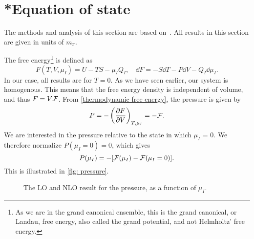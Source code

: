 \section{*Equation of state}
\label{section: equation of state}


The methods and analysis of this section are based on~\autocite{adhikariTwoflavorChiralPerturbation2019,andersenIntroductionStatisticalMechanics2012,peskinIntroductionQuantumField1995}.
All results in this section are given in units of $m_\pi$.

The free energy\footnote{
    As we are in the grand canonical ensemble, this is the grand canonical, or Landau, free energy, also called the grand potential, and not Helmholtz' free energy.
    }
is defined as
%
\begin{equation}
    \label{thermodynamic free energy}
    F(T, V, \mu_I) = U - TS - \mu_I Q_I, 
    \quad \dd 
    F = - S \dd T - P \dd V - Q_I \dd \mu_I.
\end{equation}
%
In our case, all results are for $T = 0$.
As we have seen earlier, our system is homogenous.
This means that the free energy density is independent of volume, and thus $F = V \mathcal{F}$.
From \autoref{thermodynamic free energy}, the pressure is given by
%
\begin{equation}
    P = - \left(\pdv{F}{V}\right)_{T, \mu_I} = - \mathcal{F}.
\end{equation}
%
We are interested in the pressure relative to the state in which $\mu_I$ = 0. We therefore normalize $P(\mu_I=0) = 0$, which gives  
%
\begin{equation}
    P(\mu_I) = -[\mathcal{F}(\mu_I) - \mathcal{F}(\mu_I = 0)].
\end{equation}
%
This is illustrated in \autoref{fig: pressure}.

\begin{figure}[h]
    \centering
    \vspace{-0.2cm}
    \caption{The LO and NLO result for the pressure, as a function of $\mu_I$.}
    \label{fig: pressure}
\end{figure}

